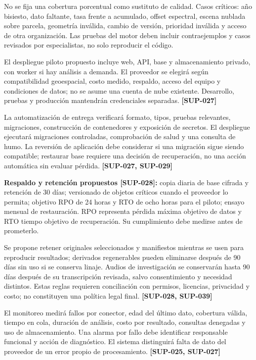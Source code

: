 \documentclass[10pt,a4paper]{article}
\begin{document}
No se fija una cobertura porcentual como sustituto de calidad. Casos críticos: año bisiesto, dato faltante, tasa frente a acumulado, offset espectral, escena nublada sobre parcela, geometría inválida, cambio de versión, prioridad inválida y acceso de otra organización. Las pruebas del motor deben incluir contraejemplos y casos revisados por especialistas, no solo reproducir el código.


El despliegue piloto propuesto incluye web, API, base y almacenamiento privado, con worker si hay análisis a demanda. El proveedor se elegirá según compatibilidad geoespacial, costo medido, respaldo, acceso del equipo y condiciones de datos; no se asume una cuenta de nube existente. Desarrollo, pruebas y producción mantendrán credenciales separadas. \textbf{[SUP-027]}


La automatización de entrega verificará formato, tipos, pruebas relevantes, migraciones, construcción de contenedores y exposición de secretos. El despliegue ejecutará migraciones controladas, comprobación de salud y una consulta de humo. La reversión de aplicación debe considerar si una migración sigue siendo compatible; restaurar base requiere una decisión de recuperación, no una acción automática sin evaluar pérdida. \textbf{[SUP-027, SUP-029]}


\textbf{Respaldo y retención propuestos [SUP-028]:} copia diaria de base cifrada y retención de 30 días; versionado de objetos críticos cuando el proveedor lo permita; objetivo RPO de 24 horas y RTO de ocho horas para el piloto; ensayo mensual de restauración. RPO representa pérdida máxima objetivo de datos y RTO tiempo objetivo de recuperación. Su cumplimiento debe medirse antes de prometerlo.


Se propone retener originales seleccionados y manifiestos mientras se usen para reproducir resultados; derivados regenerables pueden eliminarse después de 90 días sin uso si se conserva linaje. Audios de investigación se conservarán hasta 90 días después de su transcripción revisada, salvo consentimiento y necesidad distintos. Estas reglas requieren conciliación con permisos, licencias, privacidad y costo; no constituyen una política legal final. \textbf{[SUP-028, SUP-039]}


El monitoreo medirá fallos por conector, edad del último dato, cobertura válida, tiempo en cola, duración de análisis, costo por resultado, consultas denegadas y uso de almacenamiento. Una alarma por fallo debe identificar responsable funcional y acción de diagnóstico. El sistema distinguirá falta de dato del proveedor de un error propio de procesamiento. \textbf{[SUP-025, SUP-027]}
\end{document}
